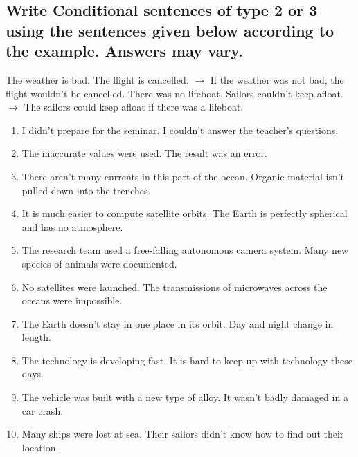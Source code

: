\subsection*{Write Conditional sentences of type 2 or 3 using the sentences given below according to the example. Answers may vary.}
 The weather is bad. The flight is cancelled. $\rightarrow$ If the weather was not bad, the flight wouldn't be cancelled. There was no lifeboat. Sailors couldn’t keep afloat. $\rightarrow$ The sailors could keep afloat if there was a lifeboat.

\begin{enumerate}
      \item I didn’t prepare for the seminar. I couldn’t answer the teacher’s questions.
      \item The inaccurate values were used. The result was an error.
      \item There aren’t many currents in this part of the ocean. Organic material isn’t pulled down into the trenches.
      \item It is much easier to compute satellite orbits. The Earth is perfectly spherical and has no atmosphere.
      \item The research team used a free-falling autonomous camera system. Many new species of animals were documented.
      \item No satellites were launched. The transmissions of microwaves across the oceans were impossible.
      \item The Earth doesn't stay in one place in its orbit. Day and night change in length.
      \item The technology is developing fast. It is hard to keep up with technology these days.
      \item The vehicle was built with a new type of alloy. It wasn’t badly damaged in a car crash.
      \item Many ships were lost at sea. Their sailors didn’t know how to find out their location.
\end{enumerate}

